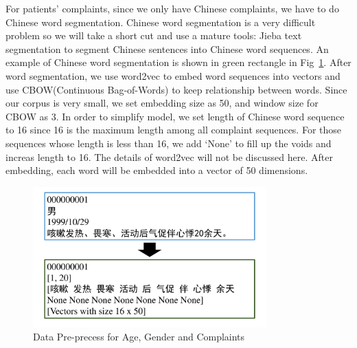 For patients' complaints, since we only have Chinese complaints, we have to do Chinese word segmentation. Chinese word segmentation is a very difficult problem so we will take a short cut and use a mature tools: Jieba text segmentation to segment Chinese sentences into Chinese word sequences. An example of Chinese word segmentation is shown in green rectangle in Fig~\ref{textinfo}.
After word segmentation, we use word2vec \cite{mikolov2013efficient} \cite{mikolov2013distributed} to embed word sequences into vectors and use CBOW(Continuous Bag-of-Words) to keep relationship between words. Since our corpus is very small, we set embedding size as 50, and window size for CBOW as 3. In order to simplify model, we set length of Chinese word sequence to 16 since 16 is the maximum length among all complaint sequences. For those sequences whose length is less than 16, we add `None' to fill up the voids and increas length to 16. The details of word2vec will not be discussed here. After embedding, each word will be embedded into a vector of 50 dimensions.
\begin{figure}[!t]
    \centerline{\includegraphics[width=90mm]{textinfo.pdf}}
    \vspace{-0cm}
    \caption{Data Pre-precess for Age, Gender and Complaints}
    \vspace{-0cm}
    \label{textinfo}
    \end{figure}